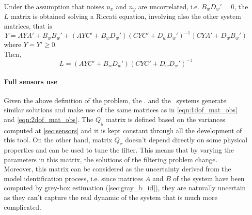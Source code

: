 Under the assumption that noises $n_x$ and $n_y$ are uncorrelated, i.e. $B_wD_w' = 0$, the $L$ matrix is obtained solving a Riccati equation, involving also the other system matrices, that is
\begin{equation}
	Y = AYA' + B_wB_w' + (AYC'+B_wD_w')(CYC'+D_wD_w')^{-1}(CYA'+D_wB_w')
	\label{eqn:riccati_kf}
\end{equation}
where $Y = Y' \geq 0$.\\
Then, 
\begin{equation}
	L = (AYC'+B_wD_w')(CYC'+D_wD_w')^{-1}
	\label{eqn:kf_gain}
\end{equation}

\paragraph{Full sensors use}
Given the above definition of the problem, the \onedof. and the \twodof\ systems generate similar solutions and make use of the same matrices as in \cref{eqn:1dof_mat_obs} and \cref{eqn:2dof_mat_obs}.
The $Q_y$ matrix is defined based on the variances computed at \cref{sec:sensors} and it is kept constant through all the development of this tool. 
On the other hand, matrix $Q_x$ doesn't depend directly on some physical properties and can be used to tune the filter. 
This means that by varying the parameters in this matrix, the solutions of the filtering problem change. \\
Moreover, this matrix can be considered as the uncertainty derived from the model identification process, i.e. since matrices $A$ and $B$ of the system have been computed by grey-box estimation (\cref{sec:gray_b_id}), they are naturally uncertain as they can't capture the real dynamic of the system that is much more complicated. \\

